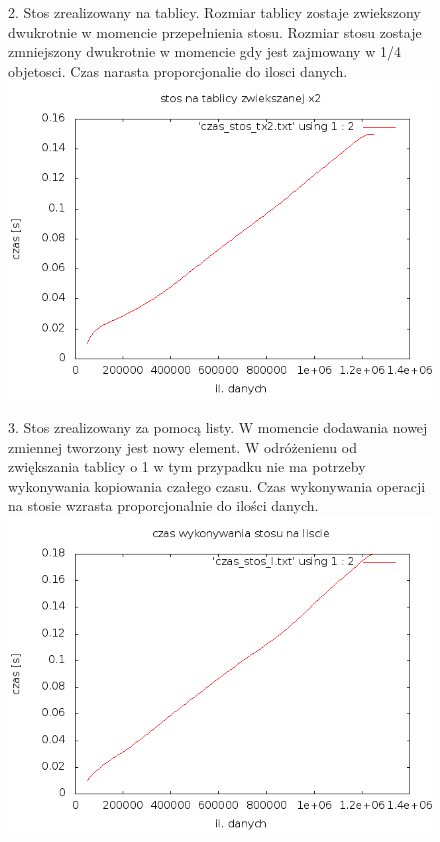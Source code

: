 \documentclass[a4paper,11pt]{report}
\begin{document}
\begin{figure}
  \begin{center}
  2. Stos zrealizowany na tablicy. Rozmiar tablicy zostaje zwiekszony dwukrotnie w momencie przepełnienia stosu. Rozmiar stosu zostaje zmniejszony dwukrotnie w momencie gdy jest zajmowany w 1/4 objetosci. Czas narasta proporcjonalie do ilosci danych.
    \includegraphics[scale=0.5]{./czas_stos_tx2.png}
    \label{fig:}
    \caption{}
  \end{center}
\end{figure}

\begin{figure}
  \begin{center}
  3. Stos zrealizowany za pomocą listy. W momencie dodawania nowej zmiennej tworzony jest nowy element. W odróżenienu od zwiększania tablicy o 1 w tym przypadku nie ma potrzeby wykonywania kopiowania czałego czasu. Czas wykonywania operacji na stosie wzrasta proporcjonalnie do ilości danych.
    \includegraphics[scale=0.5]{./czas_stos_l.png}
    \label{fig:}
    \caption{}
  \end{center}
\end{figure}
\end{document}
